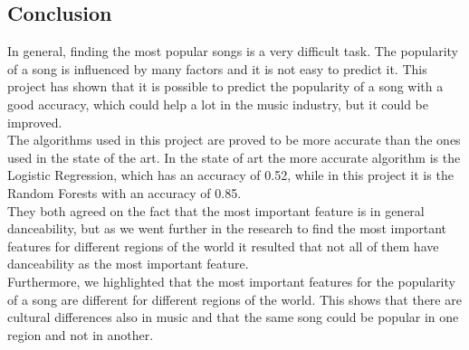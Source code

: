 \subsection{Conclusion}
In general, finding the most popular songs is a very difficult task. The popularity of a song is influenced by many factors and it is not easy to predict it. 
This project has shown that it is possible to predict the popularity of a song with a good accuracy, which could help a lot in the music industry, but it could be improved.\\
The algorithms used in this project are proved to be more accurate than the ones used in the state of the art. In the state of art the more accurate algorithm is the Logistic Regression, which has an accuracy of 0.52, while in this project it is the Random Forests with an accuracy of 0.85.\\
They both agreed on the fact that the most important feature is in general danceability, but as we went further in the research to find the most important features for different regions of the world it resulted that not all of them have danceability as the most important feature.\\
Furthermore, we highlighted that the most important features for the popularity of a song are different for different regions of the world. This shows that there are cultural differences also in music and that the same song could be popular in one region and not in another.\\

